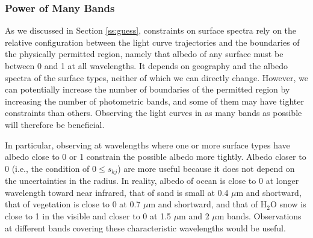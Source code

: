 \documentclass[iop,numberedappendix,apj]{emulateapj}
\begin{document}
\subsubsection{Power of Many Bands}

As we discussed in Section \ref{ss:guess}, constraints on surface spectra rely on the relative configuration between the light curve trajectories and the boundaries of the physically permitted region, namely that albedo of any surface must be between 0 and 1 at all wavelengths. 
It depends on geography and the albedo spectra of the surface types, neither of which we can directly change. 
However, we can potentially increase the number of boundaries of the permitted region by increasing the number of photometric bands, and some of them may have tighter constraints than others. 
Observing the light curves in as many bands as possible will therefore be beneficial. 

In particular, observing at wavelengths where one or more surface types have albedo close to 0 or 1 constrain the possible albedo more tightly. 
Albedo closer to 0 (i.e., the condition of $0 \le s_{kj}$) are more useful because it does not depend on the uncertainties in the radius. 
In reality, albedo of ocean is close to 0 at longer wavelength toward near infrared, that of sand is small at 0.4 $\mu $m and shortward, that of vegetation is close to 0 at 0.7 $\mu$m and shortward, and that of H$_2$O snow is close to 1 in the visible and closer to 0 at 1.5 $\mu$m and 2 $\mu$m bands. 
Observations at different bands covering these characteristic wavelengths would be useful. 
\end{document}

